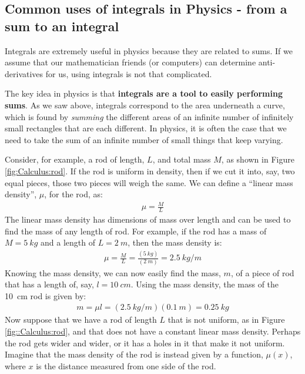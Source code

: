 \subsection{Common uses of integrals in Physics - from a sum to an integral}
Integrals are extremely useful in physics because they are related to sums. If we assume that our mathematician friends (or computers) can determine anti-derivatives for us, using integrals is not that complicated. 

The key idea in physics is that \textbf{integrals are a tool to easily performing sums}. As we saw above, integrals correspond to the area underneath a curve, which is found by \textit{summing} the different areas of an infinite number of infinitely small rectangles that are each different. In physics, it is often the case that we need to take the sum of an infinite number of small things that keep varying. 

Consider, for example, a rod of length, $L$, and total mass $M$, as shown in Figure \ref{fig:Calculus:rod}. If the rod is uniform in density, then if we cut it into, say, two equal pieces, those two pieces will weigh the same. We can define a ``linear mass density'', $\mu$, for the rod, as:
\begin{align*}
\mu = \frac{M}{L}
\end{align*} 
The linear mass density has dimensions of mass over length and can be used to find the mass of any length of rod. For example, if the rod has a mass of $M=\SI{5}{kg}$ and a length of $L=\SI{2}{m}$, then the mass density is:
\begin{align*}
\mu=\frac{M}{L}=\frac{(\SI{5}{kg})}{(\SI{2}{m})}=\SI{2.5}{kg/m}
\end{align*}
Knowing the mass density, we can now easily find the mass, $m$, of a piece of rod that has a length of, say, $l=\SI{10}{cm}$. Using the mass density, the mass of the \SI{10}{cm} rod is given by:
\begin{align*}
m=\mu l=(\SI{2.5}{kg/m})(\SI{0.1}{m})=\SI{0.25}{kg}
\end{align*}
Now suppose that we have a rod of length $L$ that is not uniform, as in Figure \ref{fig::Calculus:rod}, and that does not have a constant linear mass density. Perhaps the rod gets wider and wider, or it has a holes in it that make it not uniform. Imagine that the mass density of the rod is instead given by a function, $\mu(x)$, where $x$ is the distance measured from one side of the rod. 


